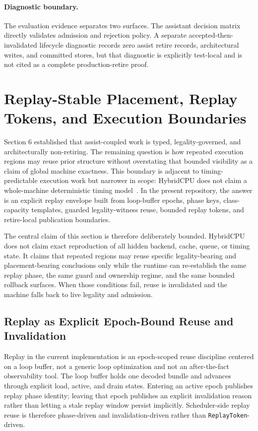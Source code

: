 \documentclass[twocolumn]{article}
\begin{document}
\paragraph{Diagnostic boundary.}
The evaluation evidence separates two surfaces. The assistant decision matrix directly validates admission and rejection policy. A separate accepted-then-invalidated lifecycle diagnostic records zero assist retire records, architectural writes, and committed stores, but that diagnostic is explicitly test-local and is not cited as a complete production-retire proof.


\section{Replay-Stable Placement, Replay Tokens, and Execution Boundaries}

Section 6 established that assist-coupled work is typed, legality-governed, and architecturally non-retiring. The remaining question is how repeated execution regions may reuse prior structure without overstating that bounded visibility as a claim of global machine exactness. This boundary is adjacent to timing-predictable execution work but narrower in scope: HybridCPU does not claim a whole-machine deterministic timing model~\cite{edwards2007pret,zimmer2014flexpret,reineke2011pret}. In the present repository, the answer is an explicit replay envelope built from loop-buffer epochs, phase keys, class-capacity templates, guarded legality-witness reuse, bounded replay tokens, and retire-local publication boundaries.

The central claim of this section is therefore deliberately bounded. HybridCPU does not claim exact reproduction of all hidden backend, cache, queue, or timing state. It claims that repeated regions may reuse specific legality-bearing and placement-bearing conclusions only while the runtime can re-establish the same replay phase, the same guard and ownership regime, and the same bounded rollback surfaces. When those conditions fail, reuse is invalidated and the machine falls back to live legality and admission.


\subsection{Replay as Explicit Epoch-Bound Reuse and Invalidation}

Replay in the current implementation is an epoch-scoped reuse discipline centered on a loop buffer, not a generic loop optimization and not an after-the-fact observability tool. The loop buffer holds one decoded bundle and advances through explicit load, active, and drain states. Entering an active epoch publishes replay phase identity; leaving that epoch publishes an explicit invalidation reason rather than letting a stale replay window persist implicitly. Scheduler-side replay reuse is therefore phase-driven and invalidation-driven rather than \texttt{ReplayToken}-driven.
\end{document}
